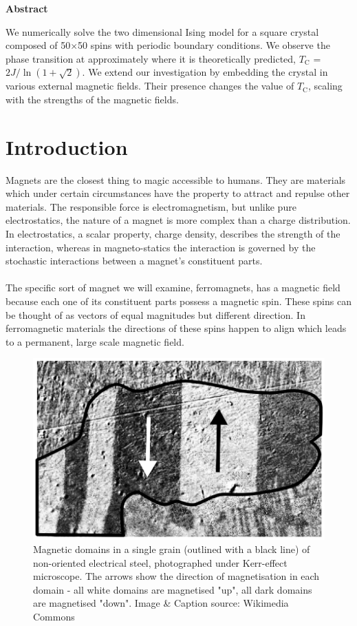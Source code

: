 \documentclass{IAYCPro}
\begin{document}
\begin{center}
    \textbf{Abstract}
\end{center}
\vspace{-1em}
    We numerically solve the two dimensional Ising model for a square crystal composed of 50$\times$50 spins with periodic boundary conditions. We observe the phase transition at approximately where it is theoretically predicted, $T_\mathrm{C}$ = $2J/\ln\left(1 + \sqrt{2}\right)$. We extend our investigation by embedding the crystal in various external magnetic fields. Their presence changes the value of $T_\mathrm{C}$, scaling with the strengths of the magnetic fields. 
\section{Introduction}
\label{sct: Introduction}
Magnets are the closest thing to magic accessible to humans. They are materials which under certain circumstances have the property to attract and repulse other materials. The responsible force is electromagnetism, but unlike pure electrostatics, the nature of a magnet is more complex than a charge distribution. In electrostatics, a scalar property, charge density, describes the strength of the interaction, whereas in magneto-statics  the interaction is governed by the stochastic interactions between a magnet's constituent parts.\\ \\
The specific sort of magnet we will examine, ferromagnets, has a magnetic field because each one of its constituent parts possess a magnetic spin. These spins can be thought of as vectors of equal magnitudes but different direction. In ferromagnetic materials the directions of these spins happen to align which leads to a permanent, large scale magnetic field.

\begin{figure}[H]
    \centering
    \includegraphics[scale = 0.25]{figs/magdomain.png}
    \caption[fuck]{\small{Magnetic domains in a single grain (outlined with a black line) of non-oriented electrical steel, photographed under Kerr-effect microscope. The arrows show the direction of magnetisation in each domain - all white domains are magnetised "up", all dark domains are magnetised "down".
    Image \& Caption source: Wikimedia Commons\footnotemark }}
    \label{fig:domain}
\end{figure}
\end{document}
